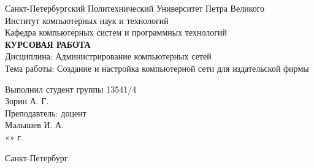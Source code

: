 
	\begin{center}		%

		Санкт-Петербургский Политехнический Университет Петра Великого\\
		Институт компьютерных наук и технологий \\
		Кафедра компьютерных систем и программных технологий\\[3cm]
		
		\huge \textbf{КУРСОВАЯ РАБОТА}\\[0.5cm]
		\large Дисциплина: Администрирование компьютерных сетей\\[0.1cm]
		\large Тема работы: Создание и настройка компьютерной сети для издательской фирмы\\[2cm]

	\end{center}


	\begin{flushright} %

				\large Выполнил студент группы 13541/4\\
				\large Зорин А. Г.\\[0.5cm]
				
				\large Преподавтель: доцент\\
				\sign[4cm]\large Малышев И. А.\\
				«\underline{\hspace{0.7cm}}» \underline{\hspace{2cm}} \the\year г.

	\end{flushright}
	
	\vfill %

	\begin{center}
	\large Санкт-Петербург\\
	\large \the\year %
	\end{center} %

\thispagestyle{empty} %
\newpage
